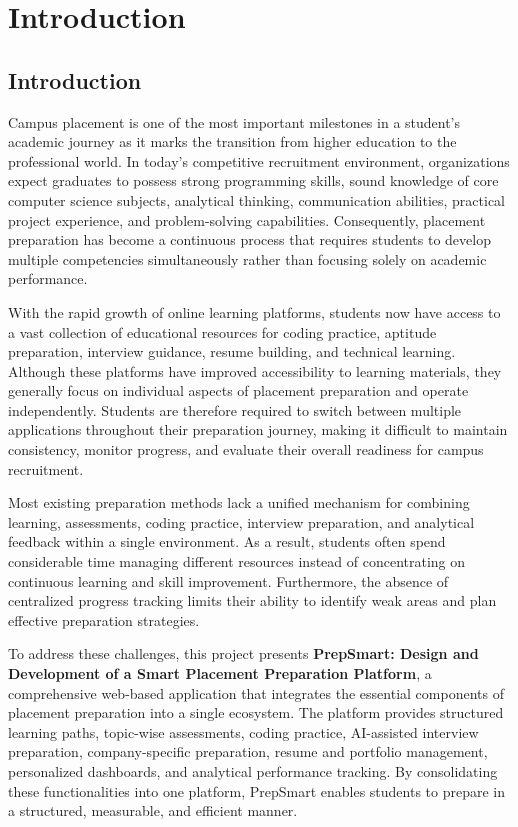 \chapter{Introduction}

\section{Introduction}

Campus placement is one of the most important milestones in a student's academic journey as it marks the transition from higher education to the professional world. In today's competitive recruitment environment, organizations expect graduates to possess strong programming skills, sound knowledge of core computer science subjects, analytical thinking, communication abilities, practical project experience, and problem-solving capabilities. Consequently, placement preparation has become a continuous process that requires students to develop multiple competencies simultaneously rather than focusing solely on academic performance.

With the rapid growth of online learning platforms, students now have access to a vast collection of educational resources for coding practice, aptitude preparation, interview guidance, resume building, and technical learning. Although these platforms have improved accessibility to learning materials, they generally focus on individual aspects of placement preparation and operate independently. Students are therefore required to switch between multiple applications throughout their preparation journey, making it difficult to maintain consistency, monitor progress, and evaluate their overall readiness for campus recruitment.

Most existing preparation methods lack a unified mechanism for combining learning, assessments, coding practice, interview preparation, and analytical feedback within a single environment. As a result, students often spend considerable time managing different resources instead of concentrating on continuous learning and skill improvement. Furthermore, the absence of centralized progress tracking limits their ability to identify weak areas and plan effective preparation strategies.

To address these challenges, this project presents \textbf{PrepSmart: Design and Development of a Smart Placement Preparation Platform}, a comprehensive web-based application that integrates the essential components of placement preparation into a single ecosystem. The platform provides structured learning paths, topic-wise assessments, coding practice, AI-assisted interview preparation, company-specific preparation, resume and portfolio management, personalized dashboards, and analytical performance tracking. By consolidating these functionalities into one platform, PrepSmart enables students to prepare in a structured, measurable, and efficient manner.

